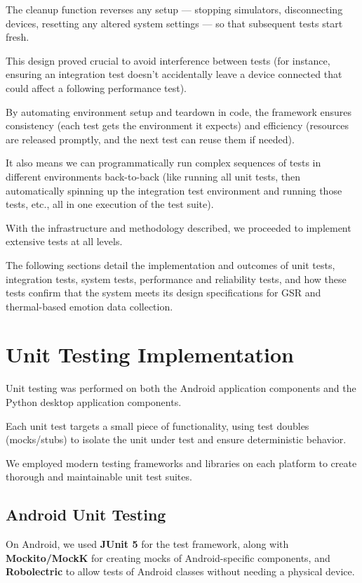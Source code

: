 {{The cleanup function reverses any setup --- stopping simulators, disconnecting
devices, resetting any altered system settings --- so that subsequent tests
start fresh.

This design proved crucial to avoid interference between tests (for instance,
ensuring an integration test doesn't accidentally leave a device connected that
could affect a following performance test).

By automating environment setup and teardown in code, the framework ensures
consistency (each test gets the environment it expects) and efficiency
(resources are released promptly, and the next test can reuse them if needed).

It also means we can programmatically run complex sequences of tests in
different environments back-to-back (like running all unit tests, then
automatically spinning up the integration test environment and running those
tests, etc., all in one execution of the test suite).

With the infrastructure and methodology described, we proceeded to implement
extensive tests at all levels.

The following sections detail the implementation and outcomes of unit tests,
integration tests, system tests, performance and reliability tests, and how
these tests confirm that the system meets its design specifications for GSR and
thermal-based emotion data collection.

\section{Unit Testing Implementation}

Unit testing was performed on both the Android application components and the
Python desktop application components.

Each unit test targets a small piece of functionality, using test doubles
(mocks/stubs) to isolate the unit under test and ensure deterministic behavior.

We employed modern testing frameworks and libraries on each platform to create
thorough and maintainable unit test suites.

\subsection{Android Unit Testing}

On Android, we used \textbf{JUnit 5}
 for the test framework, along with \textbf{Mockito/MockK}
 for creating mocks of Android-specific components, and \textbf{Robolectric}
 to allow tests of Android classes without needing a physical device.

}}
